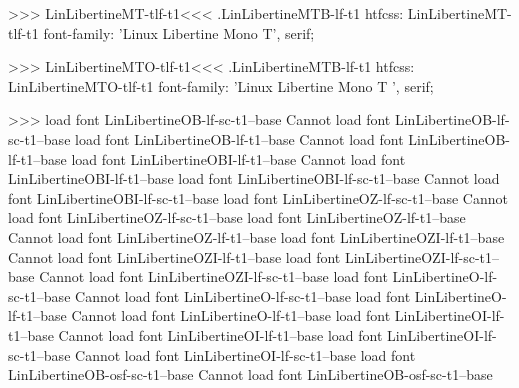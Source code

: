{{{{{{{>>>
\<LinLibertineMT-tlf-t1\><<<
.LinLibertineMTB-lf-t1
htfcss:  LinLibertineMT-tlf-t1  font-family: 'Linux Libertine Mono T', serif;

>>>
\<LinLibertineMTO-tlf-t1\><<<
.LinLibertineMTB-lf-t1
htfcss:  LinLibertineMTO-tlf-t1  font-family: 'Linux Libertine Mono T ', serif;

>>>
load font	LinLibertineOB-lf-sc-t1--base
Cannot load font LinLibertineOB-lf-sc-t1--base
load font	LinLibertineOB-lf-t1--base
Cannot load font LinLibertineOB-lf-t1--base
load font	LinLibertineOBI-lf-t1--base
Cannot load font LinLibertineOBI-lf-t1--base
load font	LinLibertineOBI-lf-sc-t1--base
Cannot load font LinLibertineOBI-lf-sc-t1--base
load font	LinLibertineOZ-lf-sc-t1--base
Cannot load font LinLibertineOZ-lf-sc-t1--base
load font	LinLibertineOZ-lf-t1--base
Cannot load font LinLibertineOZ-lf-t1--base
load font	LinLibertineOZI-lf-t1--base
Cannot load font LinLibertineOZI-lf-t1--base
load font	LinLibertineOZI-lf-sc-t1--base
Cannot load font LinLibertineOZI-lf-sc-t1--base
load font	LinLibertineO-lf-sc-t1--base
Cannot load font LinLibertineO-lf-sc-t1--base
load font	LinLibertineO-lf-t1--base
Cannot load font LinLibertineO-lf-t1--base
load font	LinLibertineOI-lf-t1--base
Cannot load font LinLibertineOI-lf-t1--base
load font	LinLibertineOI-lf-sc-t1--base
Cannot load font LinLibertineOI-lf-sc-t1--base
load font	LinLibertineOB-osf-sc-t1--base
Cannot load font LinLibertineOB-osf-sc-t1--base
}}}}}}}
